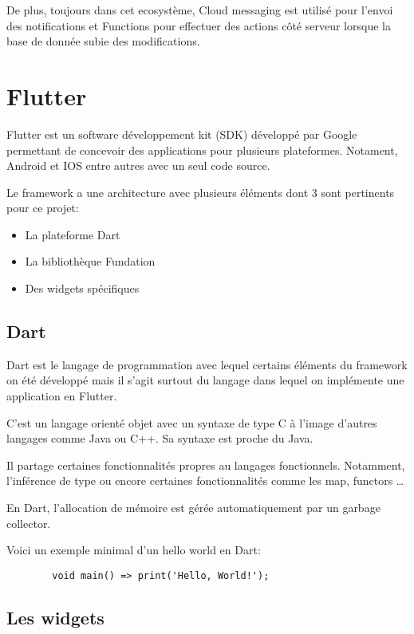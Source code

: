     De plus, toujours dans cet ecosystème, Cloud messaging est utilisé pour l'envoi des notifications et Functions pour 
    effectuer des actions côté serveur lorsque la base de donnée subie des modifications. 

    \section{Flutter}
    Flutter est un software développement kit (SDK) développé par Google permettant de concevoir
    des applications pour plusieurs plateformes. Notament, Android et IOS entre autres avec un seul code source.

    Le framework a une architecture avec plusieurs éléments dont 3 sont pertinents pour ce projet:
    \smallskip
    \begin{itemize}
        \item La plateforme Dart
        \item La bibliothèque Fundation
        \item Des widgets spécifiques
    \end{itemize}
    \smallskip
    \subsection*{Dart}
    Dart est le langage de programmation avec lequel certains éléments du framework on été développé mais il s'agit
    surtout du langage dans lequel on implémente une application en Flutter. 

    C'est un langage orienté objet avec un syntaxe de type C à l'image d'autres langages comme Java ou C++.
    Sa syntaxe est proche du Java. 
    
    Il partage certaines fonctionnalités propres au langages fonctionnels. Notamment, l'inférence de type ou encore
    certaines fonctionnalités comme les map, functors \dots

    En Dart, l'allocation de mémoire est gérée automatiquement par un garbage collector. 

    Voici un exemple minimal d'un hello world en Dart:

    \begin{verbatim}
        void main() => print('Hello, World!');
    \end{verbatim}


    \subsection{Les widgets}

